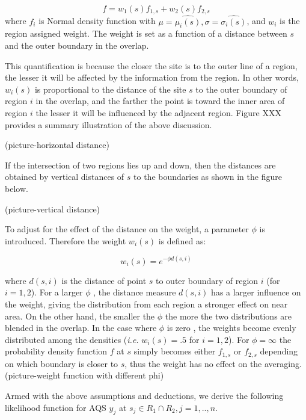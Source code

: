 \documentclass[10pt]{article}
\theoremstyle{plain}
\theoremstyle{definition}
\theoremstyle{remark}
\begin{document}
\begin{equation}\tag{1.1}\label{1.1}
f = w_{1}(s)f_{1,s} + w_{2}(s)f_{2,s}
\end{equation}
\justify
where $f_{i}$ is Normal density function with $\mu = \hat{\mu_{i}(s)}, \sigma = \hat{\sigma_{i}(s)}$, and $w_{i}$ is the region assigned weight.  The weight is set as a function of a distance between $s$ and the outer boundary in the overlap. 


\justify
This quantification is because the closer the site is to the outer line of a region, the lesser it will be affected by the information from the region.  In other words, $w_{i}(s)$ is proportional to the distance of the site $s$ to the outer boundary of region $i$ in the overlap, and the farther the point is toward the inner area of region $i$ the lesser it will be influenced by the adjacent region.  
Figure XXX provides a summary illustration of the above discussion.

(picture-horizontal distance)

\justify
If the intersection of two regions lies up and down, then the distances are obtained by vertical distances of $s$ to the boundaries as shown in the figure below.

(picture-vertical distance)

\justify
To adjust for the effect of the distance on the weight, a parameter $\phi$ is introduced.  Therefore the weight $w_{i}(s) $ is defined as:

\begin{equation}\tag{1.2}\label{1.2}
w_{i}(s) = e^{-\phi d(s,i)}
\end{equation}

\justify
where $d(s,i) $ is the  distance of point $s$ to outer boundary of region $i$ (for $i =  1,2$). For a  larger $\phi$ , the distance measure $d(s,i)$ has a  larger influence on the weight, giving the distribution from each region a stronger effect on near area.  
On the other hand, the smaller the $\phi$ the more the two distributions are blended in the overlap.  In the case where $\phi$ is zero , the weights become evenly distributed among the densities (\textit{i.e.} $w_{i}(s)=.5$ for $i=1,2$).  For $\phi=\infty$  the probability density function $f$ at $s$ simply becomes either $f_{1,s}$ or $f_{2,s}$ 
depending on which boundary is closer to $s$, thus the weight has no effect on the averaging.
(picture-weight function with different phi) 

\justify
Armed with the above assumptions and deductions, we derive the following likelihood function for  AQS $y_j$  at $s_j \in R_{1} \cap R_{2}  , j = 1,.., n.$
\end{document}
